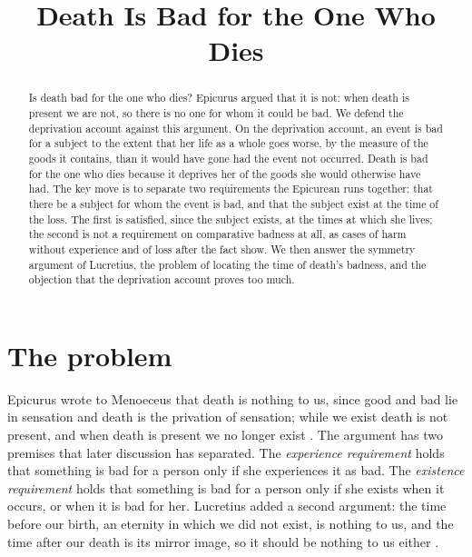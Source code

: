\documentclass{situationist-preprint}
\title{Death Is Bad for the One Who Dies}
\begin{document}
\maketitle

\begin{abstract}
Is death bad for the one who dies? Epicurus argued that it is not: when death is present we are not, so there is no one for whom it could be bad. We defend the deprivation account against this argument. On the deprivation account, an event is bad for a subject to the extent that her life as a whole goes worse, by the measure of the goods it contains, than it would have gone had the event not occurred. Death is bad for the one who dies because it deprives her of the goods she would otherwise have had. The key move is to separate two requirements the Epicurean runs together: that there be a subject for whom the event is bad, and that the subject exist at the time of the loss. The first is satisfied, since the subject exists, at the times at which she lives; the second is not a requirement on comparative badness at all, as cases of harm without experience and of loss after the fact show. We then answer the symmetry argument of Lucretius, the problem of locating the time of death's badness, and the objection that the deprivation account proves too much.
\end{abstract}

\section{The problem}

Epicurus wrote to Menoeceus that death is nothing to us, since good and bad lie in sensation and death is the privation of sensation; while we exist death is not present, and when death is present we no longer exist \citep[124--127]{EpicurusMen}. The argument has two premises that later discussion has separated. The \emph{experience requirement} holds that something is bad for a person only if she experiences it as bad. The \emph{existence requirement} holds that something is bad for a person only if she exists when it occurs, or when it is bad for her. Lucretius added a second argument: the time before our birth, an eternity in which we did not exist, is nothing to us, and the time after our death is its mirror image, so it should be nothing to us either \citep[III.832--842, 972--977]{Lucretius}.
\end{document}
